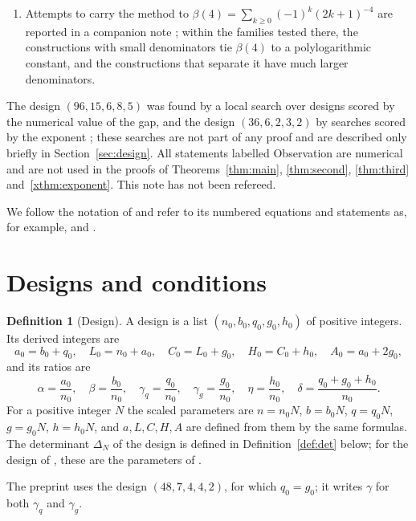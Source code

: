 \documentclass[11pt]{article}
\theoremstyle{definition}
\newtheorem{definition}[theorem]{Definition}
\begin{document}
\begin{enumerate}
\item Attempts to carry the method to $\beta(4)=\sum_{k\ge0}(-1)^k(2k+1)^{-4}$ are reported in a companion note \cite{MCSC3}; within the families tested there, the constructions with small denominators tie $\beta(4)$ to a polylogarithmic constant, and the constructions that separate it have much larger denominators.
\end{enumerate}

The design $(96,15,6,8,5)$ was found by a local search over designs scored by the numerical value of the gap, and the design $(36,6,2,3,2)$ by searches scored by the exponent \cite{Bojnal}; these searches are not part of any proof and are described only briefly in Section~\ref{sec:design}. All statements labelled Observation are numerical and are not used in the proofs of Theorems~\ref{thm:main}, \ref{thm:second}, \ref{thm:third} and~\ref{xthm:exponent}. This note has not been refereed.

We follow the notation of \cite{OAI} and refer to its numbered equations and statements as, for example, \cite[Eq.~(78)]{OAI} and \cite[Prop.~6.1]{OAI}.

\section{Designs and conditions}\label{sec:conditions}

\begin{definition}[Design]\label{def:design}
A design is a list $(n_0,b_0,q_0,g_0,h_0)$ of positive integers. Its derived integers are
\[
a_0=b_0+q_0,\quad L_0=n_0+a_0,\quad C_0=L_0+g_0,\quad H_0=C_0+h_0,\quad A_0=a_0+2g_0,
\]
and its ratios are
\[
\alpha=\frac{a_0}{n_0},\quad\beta=\frac{b_0}{n_0},\quad\gamma_q=\frac{q_0}{n_0},\quad\gamma_g=\frac{g_0}{n_0},\quad\eta=\frac{h_0}{n_0},\quad\delta=\frac{q_0+g_0+h_0}{n_0}.
\]
For a positive integer $N$ the scaled parameters are $n=n_0N$, $b=b_0N$, $q=q_0N$, $g=g_0N$, $h=h_0N$, and $a,L,C,H,A$ are defined from them by the same formulas. The determinant $\Delta_N$ of the design is defined in Definition~\ref{def:det} below; for the design of \cite{OAI}, these are the parameters of \cite[Eq.~(2)]{OAI}.
\end{definition}

The preprint uses the design $(48,7,4,4,2)$, for which $q_0=g_0$; it writes $\gamma$ for both $\gamma_q$ and $\gamma_g$.
\end{document}
